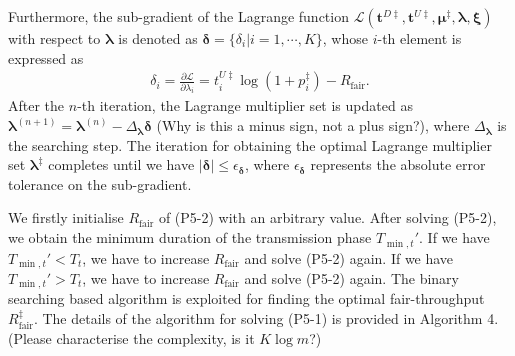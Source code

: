 \documentclass[12pt,draftcls,onecolumn,journal]{IEEEtran}
\begin{document}
Furthermore, the sub-gradient of the Lagrange function $\mathcal{L}(\mathbf{t}^{D\ddagger},\mathbf{t}^{U\ddagger},\boldsymbol{\mu}^{\ddagger},\boldsymbol{\lambda},\boldsymbol{\xi})$ with respect to $\boldsymbol{\lambda}$ is denoted as $\boldsymbol{\delta} = \{\delta_i| i=1,\cdots,K\}$, whose $i$-th element is expressed as
\begin{align}
	\delta_i = \frac{\partial\mathcal{L}}{\partial \lambda_i} = t_i^{U\ddagger} \log(1+p_i^{\ddagger}) - R_{\text{fair}}. \label{eq:fair-sg}
\end{align}
After the $n$-th iteration, the Lagrange multiplier set is updated as $\boldsymbol{\lambda}^{(n+1)} = \boldsymbol{\lambda}^{(n)} - \Delta_{\boldsymbol{\lambda}} \boldsymbol{\delta}$ {\color{red} (Why is this a minus sign, not a plus sign?)}, where $\Delta_{\boldsymbol{\lambda}}$ is the searching step. The iteration for obtaining the optimal Lagrange multiplier set $\boldsymbol{\lambda}^{\ddagger}$ completes until we have $|\boldsymbol{\delta}| \leq \epsilon_{\boldsymbol{\delta}}$, where $\epsilon_{\boldsymbol{\delta}}$ represents the absolute error tolerance on the sub-gradient.  

We firstly initialise $R_{\text{fair}}$ of (P5-2) with an arbitrary value. After solving (P5-2), we obtain the minimum duration of the transmission phase $T_{\min, t}'$. If we have $T_{\min, t}' < T_t$, we have to increase $R_{\text{fair}}$ and solve (P5-2) again.  If we have $T_{\min, t}' > T_t$, we have to increase $R_{\text{fair}}$ and solve (P5-2) again. The binary searching based algorithm is exploited for finding the optimal fair-throughput $R_{\text{fair}}^{\ddagger}$. The details of the algorithm for solving (P5-1) is provided in Algorithm 4. {\color{red} (Please characterise the complexity, is it $K\log m$?)}
\end{document}

